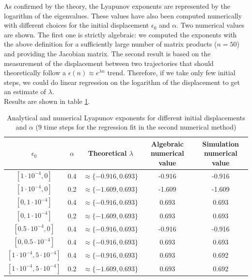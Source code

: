 \documentclass[11pt,titlepage]{article}
\begin{document}
As confirmed by the theory, the Lyapunov exponents are represented by the logarithm of the eigenvalues. These values have also been computed numerically with different choices for the initial displacement $\epsilon_0$ and $\alpha$. Two numerical values are shown. The first one is strictly algebraic: we computed the exponents with the above definition for a sufficiently large number of matrix products ($n=50$) and providing the Jacobian matrix. The second result is based on the measurement of the displacement between two trajectories that should theoretically follow a $\epsilon(n) \approx e^{\lambda n}$ trend. Therefore, if we take only few initial steps, we could do linear regression on the logarithm of the displacement to get an estimate of $\lambda$.  \\
Results are shown in table \ref{tab8}. \\

\begin{table}[h]
	\centering
	\caption{Analytical and numerical Lyapunov exponents for different initial displacements and $\alpha$ (9 time steps for the regression fit in the second numerical method)} \label{tab8}
	\begin{tabular}{ | c |c | c | c |c |}
		\hline
		$\epsilon_0$ & $\alpha$ & Theoretical $\lambda$ & Algebraic numerical value & Simulation numerical value \\
		\hline
		$[1\cdot 10^{-4},0]$ & 0.4 & $\approx \{ -0.916, 0.693\}$& -0.916 & -0.916\\
		\hline
		$[1\cdot 10^{-4},0]$ & 0.2 & $\approx \{ -1.609, 0.693\}$& -1.609& -1.609\\
		\hline
		$[0,1\cdot 10^{-4}]$ & 0.4& $\approx \{ -0.916, 0.693\}$& 0.693& 0.693\\
		\hline
		$[0,1\cdot 10^{-4}]$ & 0.2& $\approx \{ -1.609, 0.693\}$& 0.693& 0.693\\
		\hline
		$[0.5 \cdot 10^{-4},0]$& 0.4 & $\approx \{ -0.916, 0.693\}$& -0.916& -0.916\\
		\hline 
		$[0,0.5 \cdot 10^{-4}]$ & 0.4& $\approx \{ -0.916, 0.693\}$& 0.693& 0.693\\
		\hline
		$[1\cdot 10^{-4},5\cdot 10^{-4}]$ & 0.4 & $\approx \{ -0.916, 0.693\}$& 0.693& 0.692\\
		\hline
		$[1\cdot 10^{-4},5\cdot 10^{-4}]$& 0.2 & $\approx \{ -1.609, 0.693\}$& 0.693& 0.692\\
		\hline
	\end{tabular}
\end{table}
\newpage
\end{document}
